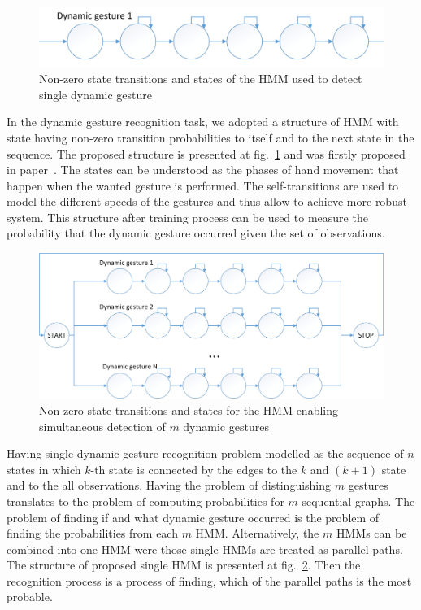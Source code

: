 \begin{figure}[htb]
\centering
 \includegraphics[width=1\columnwidth]{figures/SingleHMM.png}
 \caption{Non-zero state transitions and states of the HMM used to detect single dynamic gesture}
 \label{singlehmm}
\end{figure}

In the dynamic gesture recognition task, we adopted a structure of HMM with state having non-zero transition probabilities to itself and to the next state in the sequence.
The proposed structure is presented at fig.~\ref{singlehmm} and was firstly proposed in paper~\cite{hmm}.
The states can be understood as the phases of hand movement that happen when the wanted gesture is performed.
The self-transitions are used to model the different speeds of the gestures and thus allow to achieve more robust system.
This structure after training process can be used to measure the probability that the dynamic gesture occurred given the set of observations.

\begin{figure}[htb]
\centering
 \includegraphics[width=1\columnwidth]{figures/HMM_eng.png}
 \caption{Non-zero state transitions and states for the HMM enabling simultaneous detection of $m$ dynamic gestures}
 \label{HMMstructure}
\end{figure}

Having single dynamic gesture recognition problem modelled as the sequence of $n$ states in which $k$-th state is connected by the edges to the $k$ and $(k+1)$ state and to the all observations.
Having the problem of distinguishing $m$ gestures translates to the problem of computing probabilities for $m$ sequential graphs.
The problem of finding if and what dynamic gesture occurred is the problem of finding the probabilities from each $m$ HMM.
Alternatively, the $m$ HMMs can be combined into one HMM were those single HMMs are treated as parallel paths.
The structure of proposed single HMM is presented at fig.~\ref{HMMstructure}.
Then the recognition process is a process of finding, which of the parallel paths is the most probable.

